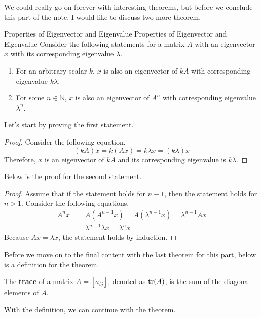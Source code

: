\documentclass[../main.tex]{subfiles}
\begin{document}
We could really go on forever with interesting theorems, but
before we conclude this part of the note, I would like to discuss
two more theorem.

\begin{theorem}{Properties of Eigenvector and Eigenvalue}
{Properties of Eigenvector and Eigenvalue}
Consider the following statements for a matrix $A$ with an
eigenvector $x$ with its corresponding eigenvalue $\lambda$.
\begin{enumerate}[noitemsep]
\item For an arbitrary scalar $k$, $x$ is also an eigenvector
of $kA$ with corresponding eigenvalue $k \lambda$.
\item For some $n \in \mathbb{N}$, $x$ is also an eigenvector
of $A^n$ with corresponding eigenvalue $\lambda^n$.
\end{enumerate}
\end{theorem}

Let's start by proving the first statement.

\begin{proof}
Consider the following equation.
\[
(kA)x = k(Ax) = k \lambda x = (k \lambda) x
\]
Therefore, $x$ is an eigenvector of $kA$ and its corresponding
eigenvalue is $k \lambda$.
\end{proof}

Below is the proof for the second statement.

\begin{proof}
Assume that if the statement holds for $n - 1$, then the statement
holds for $n > 1$. Consider the following equations.
\begin{align*}
    A^n x
    &= A \left( A^{n-1} x \right)
    = A \left( \lambda^{n-1} x \right)
    = \lambda^{n-1} Ax \\
    &= \lambda^{n-1} \lambda x
    = \lambda^n x
\end{align*}
Because $Ax = \lambda x$, the statement holds by induction.
\end{proof}

Before we move on to the final content with the last theorem for this
part, below is a definition for the theorem.

\begin{definition}
The \textbf{trace} of a matrix $A = [a_{ij}]$, denoted as $\operatorname{tr}(A)$,
is the sum of the diagonal elements of $A$.
\end{definition}

With the definition, we can continue with the theorem.
\end{document}
